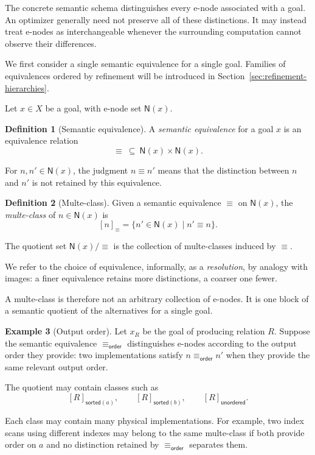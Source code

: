 \documentclass[sigconf,nonacm]{acmart}
\theoremstyle{definition}
\newtheorem{definition}{Definition}[section]
\newtheorem{example}[definition]{Example}
\theoremstyle{plain}
\theoremstyle{remark}
\begin{document}
The concrete semantic schema distinguishes every e-node associated
with a goal.  An optimizer generally need not preserve all of these
distinctions.  It may instead treat e-nodes as interchangeable whenever
the surrounding computation cannot observe their differences.

We first consider a single semantic equivalence for a single goal.
Families of equivalences ordered by refinement will be introduced in
Section~\ref{sec:refinement-hierarchies}.

Let \(x\in X\) be a goal, with e-node set \(\mathsf{N}(x)\).

\begin{definition}[Semantic equivalence]
A \emph{semantic equivalence} for a goal \(x\) is an equivalence
relation
\[
{\equiv}\ \subseteq\ \mathsf{N}(x)\times\mathsf{N}(x).
\]

For \(n,n'\in\mathsf{N}(x)\), the judgment \(n\equiv n'\) means that
the distinction between \(n\) and \(n'\) is not retained by this
equivalence.
\end{definition}

\begin{definition}[Multe-class]
Given a semantic equivalence \(\equiv\) on \(\mathsf{N}(x)\), the
\emph{multe-class} of \(n\in\mathsf{N}(x)\) is
\[
[n]_{\equiv}
=
\{n'\in\mathsf{N}(x)\mid n'\equiv n\}.
\]
\end{definition}

The quotient set \(\mathsf{N}(x)/{\equiv}\) is the collection of
multe-classes induced by \(\equiv\).

We refer to the choice of equivalence, informally, as a
\emph{resolution}, by analogy with images: a finer equivalence
retains more distinctions, a coarser one fewer.

A multe-class is therefore not an arbitrary collection of e-nodes.
It is one block of a semantic quotient of the alternatives for a
single goal.

\begin{example}[Output order]
Let \(x_R\) be the goal of producing relation \(R\).
Suppose the semantic equivalence \(\equiv_{\mathsf{order}}\)
distinguishes e-nodes according to the output order they provide:
two implementations satisfy \(n\equiv_{\mathsf{order}}n'\) when they
provide the same relevant output order.

The quotient may contain classes such as
\[
[R]_{\mathsf{sorted}(a)},
\qquad
[R]_{\mathsf{sorted}(b)},
\qquad
[R]_{\mathsf{unordered}}.
\]

Each class may contain many physical implementations.
For example, two index scans using different indexes may belong to the
same multe-class if both provide order on \(a\) and no distinction
retained by \(\equiv_{\mathsf{order}}\) separates them.
\end{example}
\end{document}
